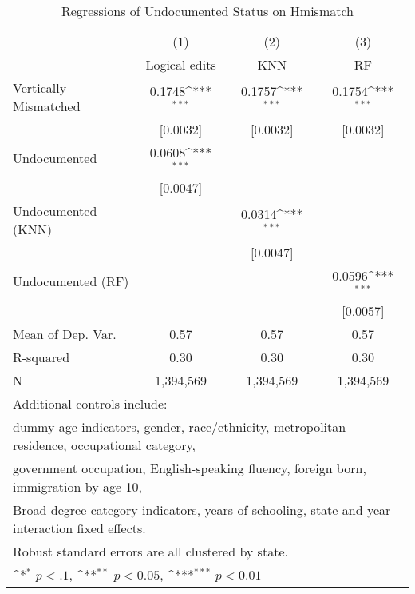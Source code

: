\begin{table}[htbp]\centering
\def\sym#1{\ifmmode^{#1}\else\(^{#1}\)\fi}
\caption{Regressions of Undocumented Status on Hmismatch}
\begin{tabular}{l*{3}{c}}
\toprule
                    &\multicolumn{1}{c}{(1)}         &\multicolumn{1}{c}{(2)}         &\multicolumn{1}{c}{(3)}         \\
                    &Logical edits         &         KNN         &          RF         \\
\midrule
Vertically Mismatched&      0.1748\sym{***}&      0.1757\sym{***}&      0.1754\sym{***}\\
                    &    [0.0032]         &    [0.0032]         &    [0.0032]         \\
\addlinespace
Undocumented        &      0.0608\sym{***}&                     &                     \\
                    &    [0.0047]         &                     &                     \\
\addlinespace
Undocumented (KNN)  &                     &      0.0314\sym{***}&                     \\
                    &                     &    [0.0047]         &                     \\
\addlinespace
Undocumented (RF)   &                     &                     &      0.0596\sym{***}\\
                    &                     &                     &    [0.0057]         \\
\midrule
Mean of Dep. Var.   &        0.57         &        0.57         &        0.57         \\
R-squared           &        0.30         &        0.30         &        0.30         \\
N                   &   1,394,569         &   1,394,569         &   1,394,569         \\
\bottomrule
\multicolumn{4}{l}{\footnotesize Additional controls include:}\\
\multicolumn{4}{l}{\footnotesize dummy age indicators, gender, race/ethnicity, metropolitan residence, occupational category,}\\
\multicolumn{4}{l}{\footnotesize government occupation, English-speaking fluency, foreign born, immigration by age 10,}\\
\multicolumn{4}{l}{\footnotesize Broad degree category indicators, years of schooling, state and year interaction fixed effects.}\\
\multicolumn{4}{l}{\footnotesize Robust standard errors are all clustered by state.}\\
\multicolumn{4}{l}{\footnotesize \sym{*} \(p<.1\), \sym{**} \(p<0.05\), \sym{***} \(p<0.01\)}\\
\end{tabular}
\end{table}
